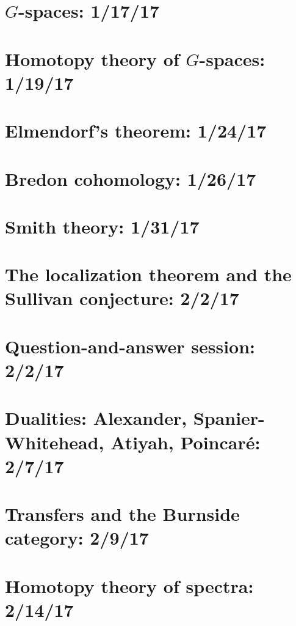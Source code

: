 \documentclass{style_EHT}
\begin{document}
\frontstuff

\section{$G$-spaces: 1/17/17}
	
\section{Homotopy theory of $G$-spaces: 1/19/17}
	
\section{Elmendorf's theorem: 1/24/17}
	
\section{Bredon cohomology: 1/26/17}
	
\section{Smith theory: 1/31/17}
	
\section{The localization theorem and the Sullivan conjecture: 2/2/17}
	
\section{Question-and-answer session: 2/2/17}
	
\section{Dualities: Alexander, Spanier-Whitehead, Atiyah, Poincaré: 2/7/17}
	
\section{Transfers and the Burnside category: 2/9/17}
	
\section{Homotopy theory of spectra: 2/14/17}
	

{}

\end{document}
